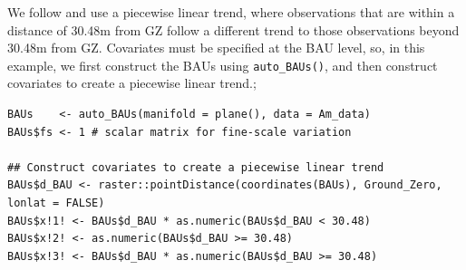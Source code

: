 \documentclass[12pt,a4paper]{article}
\begin{document}
We follow \cite{Paul_Cressie_2011_lognormal_kriging_block_prediction} and use a piecewise linear trend, where observations that are within a distance of 30.48m from GZ follow a different trend to those observations beyond 30.48m from GZ. %
Covariates must be specified at the BAU level, so, in this example, we first construct the BAUs using \texttt{auto\_BAUs()}, and then construct covariates to create a piecewise linear trend.; %

\begin{minipage}{\linewidth}
\begin{lstlisting}[style=R]
BAUs    <- auto_BAUs(manifold = plane(), data = Am_data)
BAUs$fs <- 1 # scalar matrix for fine-scale variation

## Construct covariates to create a piecewise linear trend
BAUs$d_BAU <- raster::pointDistance(coordinates(BAUs), Ground_Zero, lonlat = FALSE) 
BAUs$x!1! <- BAUs$d_BAU * as.numeric(BAUs$d_BAU < 30.48)
BAUs$x!2! <- as.numeric(BAUs$d_BAU >= 30.48) 
BAUs$x!3! <- BAUs$d_BAU * as.numeric(BAUs$d_BAU >= 30.48)
\end{lstlisting}
\end{minipage}
\end{document}

